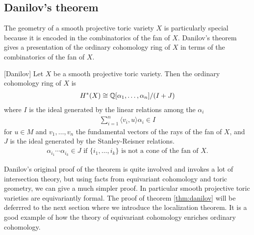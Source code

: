 \subsection{Danilov's theorem}
The geometry of a smooth projective toric variety $X$ is particularly special because
it is encoded in the combinatorics of the fan of $X$.
Danilov's theorem gives a presentation of the ordinary cohomology ring of $X$ in terms of the
combinatorics of the fan of $X$.
\begin{theorem}\label{thm:danilov}
	[Danilov]
	Let $X$ be a smooth projective toric variety. Then the ordinary cohomology ring
	of $X$ is \begin{align*}
		H^*(X)\cong \mathbb{Q}[\alpha_1,\ldots,\alpha_n]/(I+J)
	\end{align*} where $I$ is the ideal generated by the linear relations among the
	$\alpha_i$
	\begin{align*}
		\sum_{i=1}^n \langle v_i,u\rangle \alpha_i \in I
	\end{align*} for $u\in M$ and $v_1,\ldots,v_n$ the fundamental
	vectors of the rays of the fan of $X$,
	and $J$ is the ideal generated by the Stanley-Reisner relations. \begin{align*}
		\alpha_{i_1}\cdots\alpha_{i_k}\in J \text{ if } \{i_1,\ldots,i_k\} \text{ is not a cone of the fan of } X.
	\end{align*}
\end{theorem}

Danilov's original proof of the theorem is quite involved and invokes
a lot of intersection theory, but using facts from equivariant cohomology
and toric geometry, we can give a much simpler proof. In particular
smooth projective toric varieties are equivariantly formal. The proof of theorem
\ref{thm:danilov} will be deferrred to the next section where we
introduce the localization theorem. It is a good example of how the theory of equivariant
cohomology enriches ordinary cohomology.

